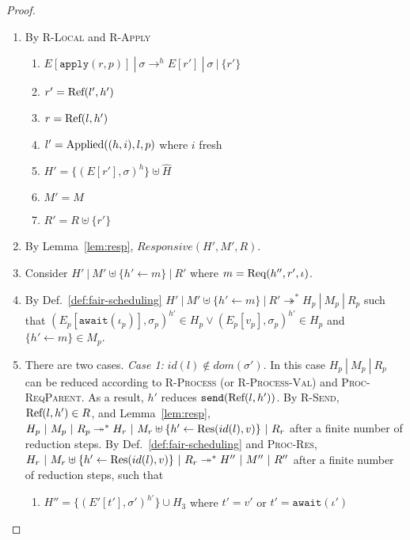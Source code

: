 \begin{lem}\label{lem:resp-apply}
\end{lem}
\begin{proof}
\begin{enumerate}
\item By \textsc{R-Local} and \textsc{R-Apply}
  \begin{enumerate}[label=(\alph*)]
  \item $E[\texttt{apply}(r, p)]~|~\sigma \rightarrow^h E[r']~|~\sigma~|~\{ r' \}$
  \item $r' = {\textrm{Ref}(l', h')}$
  \item $r = {\textrm{Ref}(l, h')}$
  \item $l' = {\textrm{Applied}((h, i), l, p)}$ where $i$ fresh
  \item $H' = \{ (E[r'], \sigma)^h \} \uplus \hat{H}$
  \item $M' = M$
  \item $R' = R \uplus \{ r' \}$
  \end{enumerate}
\item By Lemma~\ref{lem:resp}, $\mathit{Responsive}(H', M', R)$.
\item Consider $H'~|~M' \uplus \{h' \leftarrow m\}~|~R'$ where $m =
  {\textrm{Req}(h'', r', \iota)}$.
\item By Def.~\ref{def:fair-scheduling} $H'~|~M' \uplus \{h'
  \leftarrow m\}~|~R' \twoheadrightarrow^* H_p~|~M_p~|~R_p$ such that
  $(E_p[\texttt{await}(\iota_p)], \sigma_p)^{h'} \in H_p \lor
  (E_p[v_p], \sigma_p)^{h'} \in H_p$ and $\{h' \leftarrow m\} \in
  M_p$.
\item There are two cases. {\em Case 1:} $id(l) \notin
  \mathit{dom}(\sigma')$. In this case $H_p~|~M_p~|~R_p$ can be
  reduced according to \textsc{R-Process} (or \textsc{R-Process-Val})
  and \textsc{Proc-ReqParent}. As a result, $h'$ reduces
  $\texttt{send}({\textrm{Ref}(l, h')})$. By \textsc{R-Send}, ${\textrm{Ref}(l, h')}
  \in R$, and Lemma~\ref{lem:resp}, $H_p~|~M_p~|~R_p
  \twoheadrightarrow^* H_r~|~M_r \uplus \{h' \leftarrow {\textrm{Res}(id(l), v)} \}~|~R_r$ after a finite number of reduction steps. By
  Def.~\ref{def:fair-scheduling} and \textsc{Proc-Res}, $H_r~|~M_r
  \uplus \{h' \leftarrow {\textrm{Res}(id(l), v)} \}~|~R_r
  \twoheadrightarrow^* H''~|~M''~|~R''$ after a finite number of
  reduction steps, such that
  \begin{enumerate}[label=(\alph*)]
  \item $H'' = \{ (E'[t'], \sigma')^{h'} \} \cup H_3$ where $t' = v'$
    or $t' = \texttt{await}(\iota')$

\end{enumerate}
\end{enumerate}
\end{proof}
